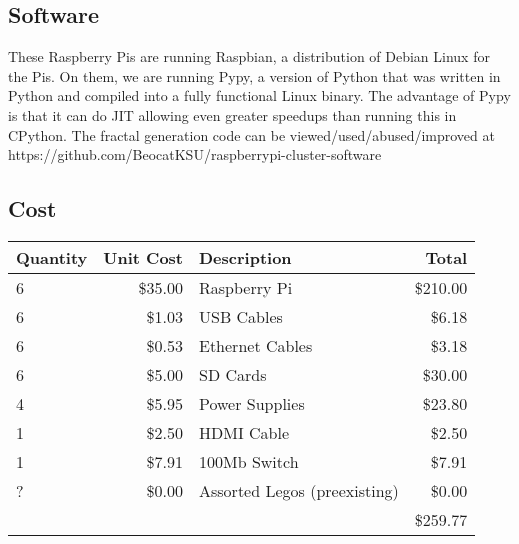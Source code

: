 \documentclass[letterpaper,10pt]{article}
\begin{document}
    \subsection{Software}
      These Raspberry Pis are running Raspbian, a distribution of Debian Linux for the Pis.
      On them, we are running Pypy, a version of Python that was written in Python and compiled into a fully functional Linux binary.
      The advantage of Pypy is that it can do JIT allowing even greater speedups than running this in CPython.
      The fractal generation code can be viewed/used/abused/improved at https://github.com/BeocatKSU/raspberrypi-cluster-software

    \subsection{Cost}
      \begin{center}
        \begin{tabular}{|l|r|l|r|}
          \hline
          \textbf{Quantity}&\textbf{Unit Cost}&\textbf{Description}&\textbf{Total}\\
          \hline
          6&\$35.00&Raspberry Pi&\$210.00\\
          6&\$1.03&USB Cables&\$6.18\\
          6&\$0.53&Ethernet Cables&\$3.18\\
          6&\$5.00&SD Cards&\$30.00\\
          4&\$5.95&Power Supplies&\$23.80\\
          1&\$2.50&HDMI Cable&\$2.50\\
          1&\$7.91&100Mb Switch&\$7.91\\
          ?&\$0.00&Assorted Legos (preexisting)&\$0.00\\
          \hline
          &&&\$259.77\\
          \hline
        \end{tabular}
      \end{center}
\end{document}
